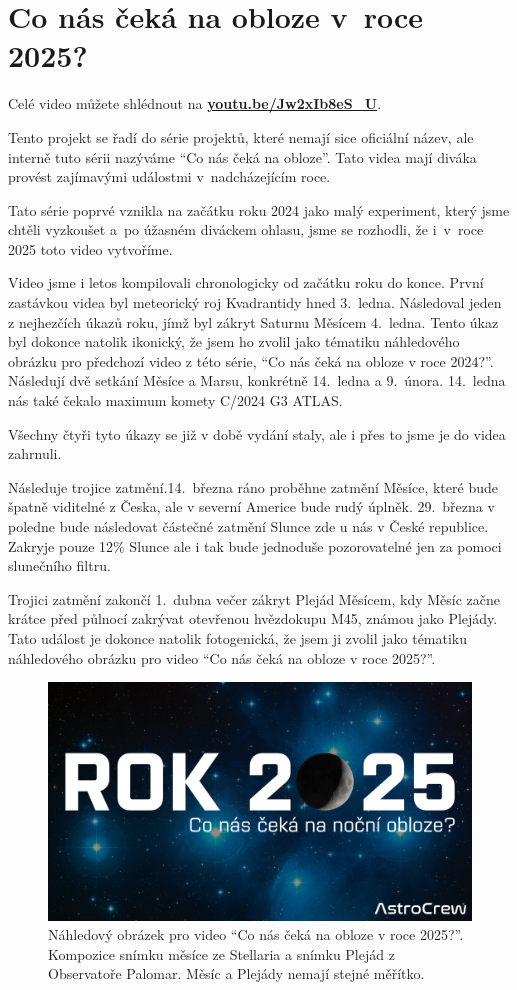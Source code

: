 \documentclass[12pt,a4paper,titlepage]{article}
\newcommand{\link}[2]{\href{#1}{\textcolor{link-color}{\textbf{#2}}}}%
\begin{document}
\section{Co nás čeká na obloze v~roce 2025?}
Celé video můžete shlédnout na \link{https://youtu.be/Jw2xIb8eS\_U}{youtu.be/Jw2xIb8eS\_U}.

Tento projekt se řadí do série projektů, které nemají sice oficiální název, ale interně tuto sérii nazýváme \enquote{Co nás čeká na obloze}. Tato videa mají diváka provést zajímavými událostmi v~nadcházejícím roce.

Tato série poprvé vznikla na začátku roku 2024 jako malý experiment, který jsme chtěli vyzkoušet a~po úžasném diváckem ohlasu, jsme se rozhodli, že i~v~roce 2025 toto video vytvoříme.

Video jsme i letos kompilovali chronologicky od začátku roku do konce. První zastávkou videa byl meteorický roj Kvadrantidy hned 3.\ ledna. Následoval jeden z nejhezčích úkazů roku, jímž byl zákryt Saturnu Měsícem 4.\ ledna. Tento úkaz byl dokonce natolik ikonický, že jsem ho zvolil jako tématiku náhledového obrázku pro předchozí video z této série, \enquote{Co nás čeká na obloze v roce 2024?}. Následují dvě setkání Měsíce a Marsu, konkrétně 14.\ ledna a 9.\ února. 14.\ ledna nás také čekalo maximum komety C/2024 G3 ATLAS.\@

Všechny čtyři tyto úkazy se již v době vydání staly, ale i přes to jsme je do videa zahrnuli.

Následuje trojice zatmění.\@ 14.\ března ráno proběhne zatmění Měsíce, které bude špat\-ně viditelné z Česka, ale v severní Americe bude rudý úplněk. 29.\ března v poledne bude následovat částečné zatmění Slunce zde u nás v České republice. Zakryje pouze 12\% Slunce ale i tak bude jednoduše pozorovatelné jen za pomoci slunečního filtru. 

Trojici zatmění zakončí 1.\ dubna večer zákryt Plejád Měsícem, kdy Měsíc začne krátce před půlnocí zakrývat otevřenou hvězdokupu M45, známou jako Plejády. Tato událost je dokonce natolik fotogenická, že jsem ji zvolil jako tématiku náhledového obrázku pro video \enquote{Co nás čeká na obloze v roce 2025?}.

\begin{figure}[H]
	\centering
	\includegraphics[width=.95\textwidth]{nahledovka-v2.jpg}
	\caption{Náhledový obrázek pro video \enquote{Co nás čeká na obloze v roce 2025?}. Kompozice snímku měsíce ze Stellaria a snímku Plejád z Observatoře Palomar. Měsíc a Plejády nemají stejné měřítko.}\label{prac:nahledovka-v2}
\end{figure}
\end{document}
